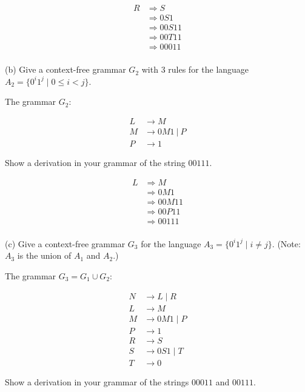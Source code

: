 \documentclass[12pt,letterpaper,final]{report}
\begin{document}
\begin{align*}
  R & \Rightarrow S     \\
    & \Rightarrow 0S1   \\
    & \Rightarrow 00S11 \\
    & \Rightarrow 00T11 \\
    & \Rightarrow 00011 \\
\end{align*}

(b)  Give a context-free grammar $G_2$ with $3$ rules for the language $A_2 = \{0^i 1^j \mid 0 \leq  i < j\}$.

The grammar $G_2$:

\begin{align*}
  L & \to M             \\
  M & \to 0M1\ \vert\ P \\
  P & \to 1\
\end{align*}


Show a derivation in your grammar of the string $00111$.

\begin{align*}
  L & \Rightarrow M     \\
    & \Rightarrow 0M1   \\
    & \Rightarrow 00M11 \\
    & \Rightarrow 00P11 \\
    & \Rightarrow 00111 \\
\end{align*}


(c)   Give a context-free grammar $G_3$ for the language $A_3 = \{0^i 1^j \mid i \not=  j\}$. (Note: $A_3$ is the union of $A_1$ and $A_2$.)

The grammar $G_3 = G_1 \cup G_2$:

\begin{align*}
  N & \to L \mid R   \\
  L & \to M          \\
  M & \to 0M1 \mid P \\
  P & \to 1          \\
  R & \to S          \\
  S & \to 0S1 \mid T \\
  T & \to 0
\end{align*}

Show a derivation in your grammar of the strings $00011$ and $00111$.
\end{document}

